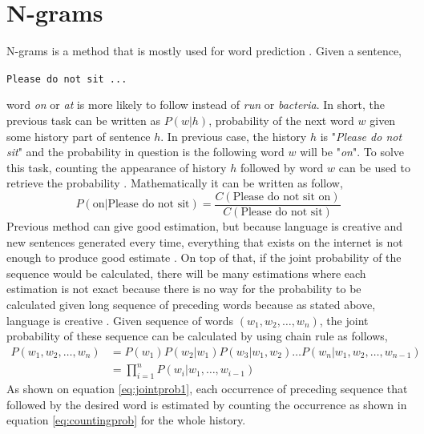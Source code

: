 \section{N-grams}
    N-grams is a method that is mostly used for word prediction
    \citep{speech2009Jurafsky:2009:SLP:1214993}. Given a sentence,
    \begin{center}
        \texttt{Please do not sit ...}
    \end{center}
    word \textit{on} or \textit{at} is more likely to follow instead
    of \textit{run} or \textit{bacteria}. In short, the previous task
    can be written as $P(w\vert h)$, probability of the next word $w$
    given some history part of sentence $h$. In previous case, the
    history $h$ is "\textit{Please do not sit}" and the probability in
    question is the following word $w$ will be "\textit{on}". To solve
    this task, counting the appearance of history $h$ followed by word
    $w$ can be used to retrieve the probability
    \citep{speech2009Jurafsky:2009:SLP:1214993}. Mathematically it can
    be written as follow,
    \begin{equation*}
        \label{eq:countingprob}
        P(\text{on} \vert \text{Please do not sit}) = 
        \frac{C(\text{Please do not sit on})}{C(\text{Please do not sit})}
    \end{equation*}
    Previous method can give good estimation, but because language is
    creative and new sentences generated every time, everything that
    exists on the internet is not enough to produce good estimate
    \citep{speech2009Jurafsky:2009:SLP:1214993}. On top of that, if
    the joint probability of the sequence would be calculated, there
    will be many estimations where each estimation is not exact
    because there is no way for the probability to be calculated given
    long sequence of preceding words because as stated above,
    language is creative
    \citep{speech2009Jurafsky:2009:SLP:1214993}. Given sequence of
    words $(w_1, w_2, \dots, w_n)$, the joint probability of these
    sequence can be calculated by using chain rule as follows,
    \begin{align}
        \label{eq:jointprob1}
        P(w_1, w_2, \dots, w_n) &= P(w_1)P(w_2 \vert w_1)P(w_3 \vert w_1, w_2) \dots
        P(w_n \vert w_1, w_2, \dots, w_{n-1}) \\
        \label{eq:jointprob2}
        &= \prod_{i=1}^n P(w_i \vert w_1, \dots, w_{i-1})
    \end{align}
    As shown on equation \ref{eq:jointprob1}, each occurrence of
    preceding sequence that followed by the desired word is estimated
    by counting the occurrence as shown in equation
    \ref{eq:countingprob} for the whole history.
    
